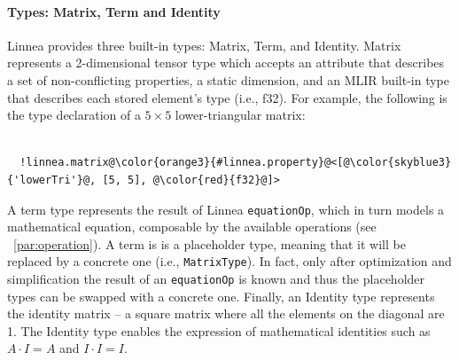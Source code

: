 \documentclass[conference]{IEEEtran}
\begin{document}
\paragraph{Types: Matrix, Term and Identity}
Linnea provides three built-in types: Matrix, Term, and Identity. Matrix
represents a 2-dimensional tensor type which accepts an attribute that
describes a set of non-conflicting properties, a static dimension, and an MLIR
built-in type that describes each stored element's type (i.e., f32). 
For example, the following is the type declaration of a $5\times5$ lower-triangular matrix:
\begin{verbatim}

  !linnea.matrix@\color{orange3}{#linnea.property}@<[@\color{skyblue3}{'lowerTri'}@, [5, 5], @\color{red}{f32}@]>

\end{verbatim}

A term type represents the result of Linnea \texttt{equationOp}, which in turn
models a mathematical equation, composable by the available operations (see
~\ref{par:operation}). A term is is a placeholder type, meaning that it will be
replaced by a concrete one (i.e., \texttt{MatrixType}).  In fact, only after
optimization and simplification the result of an \texttt{equationOp} is known
and thus the placeholder types can be swapped with a concrete one. Finally, an
Identity type represents the identity matrix -- a square matrix where all the
elements on the diagonal are 1. The Identity type enables the expression of
mathematical identities such as $A \cdot I = A$ and $I \cdot I = I$.

\end{document}
